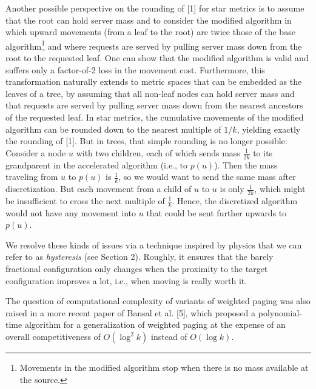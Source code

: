 Another possible perspective on the rounding of [1] for star metrics is to assume that the root can hold server mass and to consider the modified algorithm in which upward movements (from a leaf to the root) are twice those of the base algorithm\footnote{Movements in the modified algorithm stop when there is no mass available at the source.} and where requests are served by pulling server mass down from the root to the requested leaf. One can show that the modified algorithm is valid and suffers only a factor-of-2 loss in the movement cost. Furthermore, this transformation naturally extends to metric spaces that can be embedded as the leaves of a tree, by assuming that all non-leaf nodes can hold server mass and that requests are served by pulling server mass down from the nearest ancestors of the requested leaf. In star metrics, the cumulative movements of the modified algorithm can be rounded down to the nearest multiple of $1/k$, yielding exactly the rounding of [1]. But in trees, that simple rounding is no longer possible: Consider a node $u$ with two children, each of which sends mass $\frac{1}{2k}$ to its grandparent in the accelerated algorithm (i.e., to $p(u)$). Then the mass traveling from $u$ to $p(u)$ is $\frac{1}{k}$, so we would want to send the same mass after discretization. But each movement from a child of $u$ to $u$ is only $\frac{1}{2k}$, which might be insufficient to cross the next multiple of $\frac{1}{k}$. Hence, the discretized algorithm would not have any movement into $u$ that could be sent further upwards to $p(u)$.\par




We resolve these kinds of issues via a technique inspired by physics that we can refer to as \emph{hysteresis} (see Section 2). Roughly, it ensures that the barely fractional configuration only changes when the proximity to the target configuration improves a lot, i.e., when moving is really worth it.\par




The question of computational complexity of variants of weighted paging was also raised in a more recent paper of Bansal et al. [5], which proposed a polynomial-time algorithm for a generalization of weighted paging at the expense of an overall competitiveness of $O(\log^{2}k)$ instead of $O(\log k)$.\par





